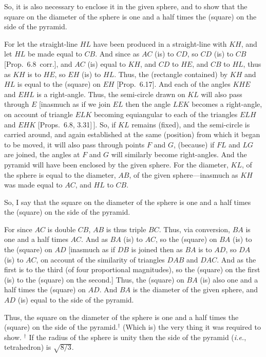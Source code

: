 So, it is also necessary to enclose it in the given sphere, and to show that
the square on the diameter of the sphere is one and a half times the (square)
on the side of the pyramid. 

For let the straight-line $HL$ have been produced in a straight-line with $KH$, and let
$HL$ be made equal to $CB$. And since as $AC$ (is) to $CD$, 
so $CD$ (is) to $CB$ [Prop.~6.8~corr.], and $AC$ (is) equal to $KH$, and $CD$ to
$HE$, and $CB$ to $HL$, thus as $KH$ is to $HE$, so $EH$ (is) to $HL$.
Thus,  the (rectangle contained) by $KH$ and $HL$ is equal to the
(square) on $EH$ [Prop.~6.17]. And each of the angles $KHE$ and
$EHL$ is a right-angle. Thus, the semi-circle drawn on $KL$ 
will also pass through $E$ [inasmuch as if we join $EL$ then the angle
$LEK$ becomes a right-angle, on account of triangle $ELK$
becoming equiangular to each of the triangles $ELH$ and $EHK$ [Props.~6.8, 3.31]\,]. So, if
$KL$ remains (fixed), and the semi-circle is carried around, and again
established at the same (position) from which it began to be moved, 
it will also pass through points $F$ and $G$, (because) if  $FL$ and
$LG$ are joined, the angles at $F$ and $G$ will similarly become  right-angles. And the pyramid will have been enclosed by the given sphere.
For the diameter, $KL$,  of the sphere is equal to the diameter, $AB$,
of the given sphere---inasmuch as $KH$ was made equal to $AC$, 
and $HL$ to $CB$. 

So, I say that the square on the diameter of the sphere is
one and a half times the (square) on the side of the pyramid.

For since $AC$ is double $CB$, $AB$ is thus triple $BC$. Thus,
via conversion, $BA$ is one and a half times $AC$. And as
$BA$ (is) to $AC$, so the (square) on $BA$ (is) to the (square) on $AD$
[inasmuch as if $DB$ is joined then as $BA$ is to $AD$, so
$DA$ (is) to $AC$, on account of the similarity of triangles
$DAB$ and $DAC$. And as the first is to the third (of four
proportional magnitudes), so the (square) on the first (is) to the
(square) on the second.] Thus, the (square) on $BA$
(is) also one and a half times the (square) on $AD$. 
And $BA$ is the diameter of the given sphere, and $AD$
(is) equal to the side of the pyramid.

Thus, the square on the diameter of the sphere is one and a half
times the (square) on the side of the pyramid.$^\dag$ (Which is) the very thing
it was required to show.
{\footnotesize\noindent$^\dag$ If the radius of the sphere is unity then the side of the pyramid ({\em i.e.}, tetrahedron) is $\sqrt{8/3}$.}


